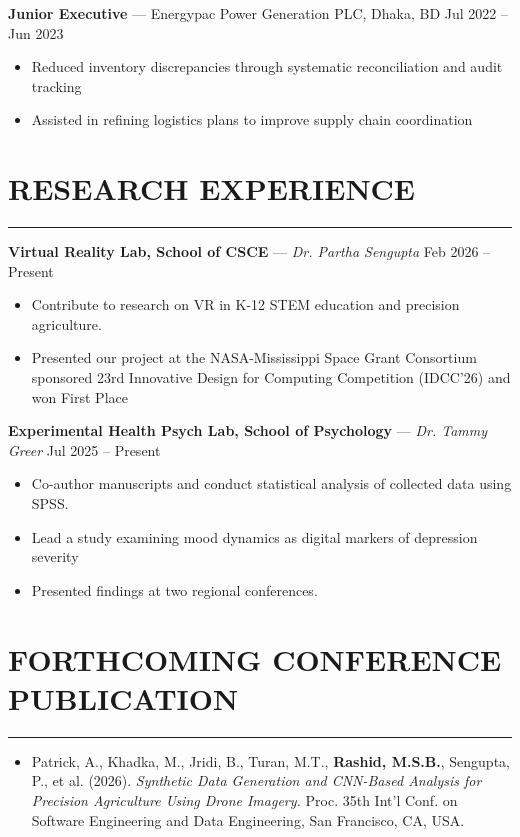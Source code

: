 \documentclass[10pt, letterpaper]{article}
\begin{document}
\begin{minipage}[t]{0.72\textwidth}
\textbf{Junior Executive} --- Energypac Power Generation PLC, Dhaka, BD \hfill Jul 2022 -- Jun 2023
\begin{itemize}[label=--, nosep]
    \item Reduced inventory discrepancies through systematic reconciliation and audit tracking
    \item Assisted in refining logistics plans to improve supply chain coordination
\end{itemize}

\vspace{4pt}

\section*{RESEARCH EXPERIENCE}\vspace{-2pt}\hrule\vspace{6pt}
\textbf{Virtual Reality Lab, School of CSCE} --- \textit{Dr. Partha Sengupta} \hfill Feb 2026 -- Present
\begin{itemize}[label=--, nosep]
    \item Contribute to research on VR in K-12 STEM education and precision agriculture.
    \item Presented our project at the NASA-Mississippi Space Grant Consortium sponsored 23rd Innovative Design for Computing Competition (IDCC’26) and won First Place
\end{itemize}

\vspace{7pt}

\textbf{Experimental Health Psych Lab, School of Psychology} --- \textit{Dr. Tammy Greer} \hfill Jul 2025 -- Present
\begin{itemize}[label=--, nosep]
    \item Co-author manuscripts and conduct statistical analysis of collected data using SPSS.
    \item Lead a study examining mood dynamics as digital markers of depression severity
    \item Presented findings at two regional conferences.
\end{itemize}

\vspace{4pt}

\section*{FORTHCOMING CONFERENCE PUBLICATION}\vspace{-2pt}\hrule\vspace{6pt}
\begin{itemize}
    \item Patrick, A., Khadka, M., Jridi, B., Turan, M.T., \textbf{Rashid, M.S.B.}, Sengupta, P., et al. (2026). \textit{Synthetic Data Generation and CNN-Based Analysis for Precision Agriculture Using Drone Imagery.} Proc. 35th Int'l Conf. on Software Engineering and Data Engineering, San Francisco, CA, USA.
\end{itemize}


\end{minipage}
\end{document}
